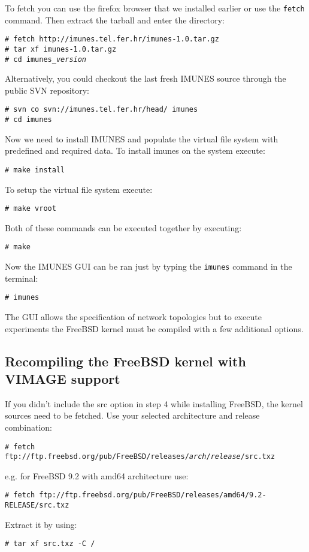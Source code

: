 To fetch you can use the firefox browser that we installed earlier or use the
\texttt{fetch} command. Then extract the tarball and enter the directory:

\texttt{\# fetch http://imunes.tel.fer.hr/imunes-1.0.tar.gz}\\
\texttt{\# tar xf imunes-1.0.tar.gz}\\
\texttt{\# cd imunes\_\emph{version}}

Alternatively, you could checkout the last fresh IMUNES source through the
public SVN repository:

\texttt{\# svn co svn://imunes.tel.fer.hr/head/ imunes}\\
\texttt{\# cd imunes}

Now we need to install IMUNES and populate the virtual file system with predefined and required data. To install imunes on the system execute:

\texttt{\# make install}

To setup the virtual file system execute:

\texttt{\# make vroot}

Both of these commands can be executed together by executing:

\texttt{\# make}

Now the IMUNES GUI can be ran just by typing the \texttt{imunes} command in the
terminal:

\texttt{\# imunes}

The GUI allows the specification of network topologies but to execute
experiments the FreeBSD kernel must be compiled with a few additional options.

\subsection{Recompiling the FreeBSD kernel with VIMAGE support}

If you didn't include the src option in step 4 while installing FreeBSD, the
kernel sources need to be fetched. Use your selected architecture and release combination:

\texttt{\# fetch ftp://ftp.freebsd.org/pub/FreeBSD/releases/\emph{arch}/\emph{release}/src.txz}

e.g. for FreeBSD 9.2 with amd64 architecture use:

\texttt{\# fetch ftp://ftp.freebsd.org/pub/FreeBSD/releases/amd64/9.2-RELEASE/src.txz}

Extract it by using:

\texttt{\# tar xf src.txz -C /}

